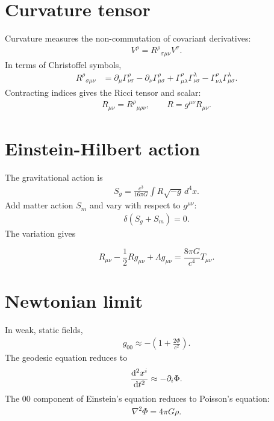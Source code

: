 \documentclass[11pt,a4paper]{article}
\begin{document}
\section{Curvature tensor}
Curvature measures the non-commutation of covariant derivatives:
\begin{align}
[\nabla_\mu,\nabla_\nu]V^\rho=R^\rho{}_{\sigma\mu\nu}V^\sigma.
\end{align}
In terms of Christoffel symbols,
\begin{align}
R^\rho{}_{\sigma\mu\nu}
&=\partial_\mu\Gamma^\rho_{\nu\sigma}
-\partial_\nu\Gamma^\rho_{\mu\sigma}
+\Gamma^\rho_{\mu\lambda}\Gamma^\lambda_{\nu\sigma}
-\Gamma^\rho_{\nu\lambda}\Gamma^\lambda_{\mu\sigma}.
\end{align}
Contracting indices gives the Ricci tensor and scalar:
\begin{align}
R_{\mu\nu}=R^\rho{}_{\mu\rho\nu},\qquad R=g^{\mu\nu}R_{\mu\nu}.
\end{align}

\section{Einstein-Hilbert action}
The gravitational action is
\begin{align}
S_g=\frac{c^3}{16\pi G}\int R\sqrt{-g}\,d^4x.
\end{align}
Add matter action $S_m$ and vary with respect to $g^{\mu\nu}$:
\begin{align}
\delta(S_g+S_m)=0.
\end{align}
The variation gives
\begin{resultbox}
\[
R_{\mu\nu}-\frac{1}{2}Rg_{\mu\nu}+\Lambda g_{\mu\nu}=\frac{8\pi G}{c^4}T_{\mu\nu}.
\]
\end{resultbox}

\section{Newtonian limit}
In weak, static fields,
\begin{align}
g_{00}\approx -\left(1+\frac{2\Phi}{c^2}\right).
\end{align}
The geodesic equation reduces to
\begin{align}
\dv[2]{x^i}{t}\approx -\partial_i\Phi.
\end{align}
The $00$ component of Einstein's equation reduces to Poisson's equation:
\begin{align}
\nabla^2\Phi=4\pi G\rho.
\end{align}
\end{document}

